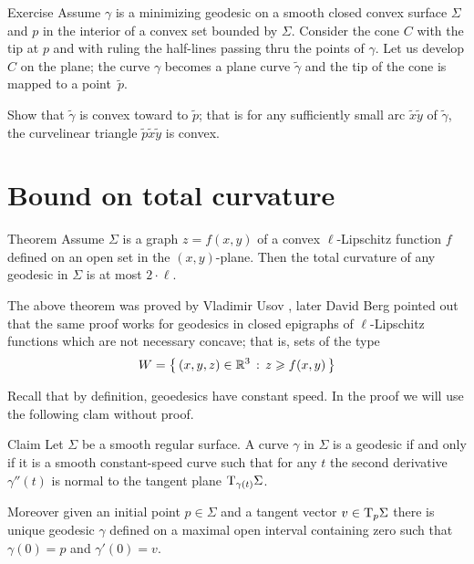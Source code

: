 \begin{thm}{Exercise}
Assume $\gamma$ is a minimizing geodesic on a smooth closed convex surface $\Sigma$ and $p$ in the interior of a convex set bounded by $\Sigma$.
Consider the cone $C$ with the tip at $p$ and with ruling the half-lines passing thru the points of $\gamma$.
Let us develop $C$ on the plane; the curve $\gamma$ becomes a plane curve $\tilde\gamma$ and the tip of the cone is mapped to a point~$\tilde p$.

Show that $\tilde\gamma$ is convex toward to $\tilde p$; that is for any sufficiently small arc $\tilde x\tilde y$ of $\tilde\gamma$, the curvelinear triangle $\tilde p\tilde x\tilde y$ is convex. 
\end{thm}



\section{Bound on total curvature}




\begin{thm}{Theorem}\label{thm:usov}
Assume $\Sigma$ is a graph $z=f(x,y)$ of a convex $\ell$-Lipschitz function $f$ defined on an open set in the $(x,y)$-plane.
Then the total curvature of any geodesic in $\Sigma$ is at most $2\cdot \ell$.
\end{thm}

The above theorem was proved by Vladimir Usov \cite{usov},
later David Berg \cite{berg} pointed out that the same proof works for geodesics in closed epigraphs of $\ell$-Lipschitz functions which are not necessary concave; that is, sets of the type 
\[W=\left\{\,{(x,y,z)\in\mathbb{R}^3}\,:\,{z\geqslant f(x,y)}\,\right\}\]


Recall that by definition, geoedesics  have constant speed.
In the proof we will use the following clam without proof.

\begin{thm}{Claim}\label{clm:gamma''}
Let $\Sigma$ be a smooth regular surface.
A curve $\gamma$ in $\Sigma$ is a geodesic if and only if it is a smooth constant-speed curve
such that  for any $t$ the second derivative $\gamma''(t)$ is normal to the tangent plane $\mathrm{T}_{\gamma(t)}\Sigma$.

Moreover given an initial point $p\in \Sigma$ and a tangent vector $v\in\mathrm{T}_p\Sigma$ there is unique geodesic $\gamma$ defined on a maximal open interval containing zero such that $\gamma(0)=p$ and $\gamma'(0)=v$.
\end{thm}

